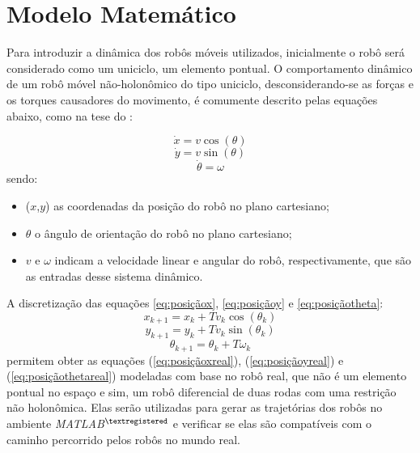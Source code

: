 \section{Modelo Matemático}
\label{sec:modMatematico}
Para introduzir a dinâmica dos robôs móveis utilizados, inicialmente o robô será considerado como um uniciclo, um elemento pontual. O comportamento dinâmico de um robô móvel não-holonômico do tipo uniciclo, desconsiderando-se as forças e os torques causadores do movimento, é comumente descrito pelas equações abaixo, como na tese do :

\begin{equation}
	\dot{x} = v\cos(\theta) 
	\label{eq:posiçãox}
\end{equation}
\begin{equation}
	\dot{y} = v\sin(\theta)
	\label{eq:posiçãoy}
\end{equation}
\begin{equation}
	\dot{\theta} = \omega
	\label{eq:posiçãotheta}
\end{equation}
sendo:
\begin{itemize}
	\item ($x$,$y$) as coordenadas da posição do robô no plano cartesiano;
	\item $\theta$ o ângulo de orientação do robô no plano cartesiano;
	\item $v$ e $\omega$ indicam a velocidade linear e angular do robô, respectivamente, que são as entradas desse sistema dinâmico.	
\end{itemize}

A discretização das equações \ref{eq:posiçãox}, \ref{eq:posiçãoy} e \ref{eq:posiçãotheta}: 
\begin{equation}
x_{k+1} = x_{k} + Tv_{k}\cos(\theta_{k}) 
\label{eq:posiçãoxdisc}
\end{equation}
\begin{equation}
y_{k+1} = y_{k} + Tv_{k}\sin(\theta_{k})
\label{eq:posiçãoydisc}
\end{equation}
\begin{equation}
\theta_{k+1} = \theta_{k} + T\omega_{k}
\label{eq:posiçãothetadisc}
\end{equation}
permitem obter as equações (\ref{eq:posiçãoxreal}), (\ref{eq:posiçãoyreal}) e (\ref{eq:posiçãothetareal}) modeladas com base no robô real, que não é um elemento pontual no espaço e sim, um robô diferencial de duas rodas com uma restrição não holonômica. Elas serão utilizadas para gerar as trajetórias dos robôs no ambiente \emph{MATLAB$^{\textregistered}$} e verificar se elas são compatíveis com o caminho percorrido pelos robôs no mundo real. 

